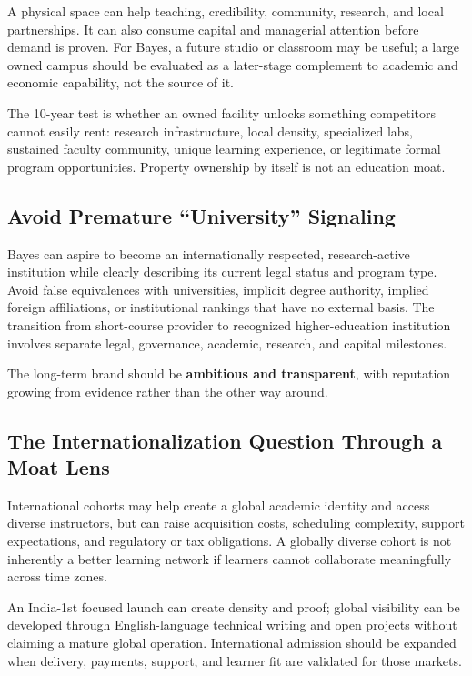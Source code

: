 A physical space can help teaching, credibility, community, research, and local partnerships. It can also consume capital and managerial attention before demand is proven. For Bayes, a future studio or classroom may be useful; a large owned campus should be evaluated as a later-stage complement to academic and economic capability, not the source of it.

The 10-year test is whether an owned facility unlocks something competitors cannot easily rent: research infrastructure, local density, specialized labs, sustained faculty community, unique learning experience, or legitimate formal program opportunities. Property ownership by itself is not an education moat.

\subsection{Avoid Premature ``University'' Signaling}
\label{sec:avoid_premature_university_signaling}

Bayes can aspire to become an internationally respected, research-active institution while clearly describing its current legal status and program type. Avoid false equivalences with universities, implicit degree authority, implied foreign affiliations, or institutional rankings that have no external basis. The transition from short-course provider to recognized higher-education institution involves separate legal, governance, academic, research, and capital milestones.

The long-term brand should be \textbf{ambitious and transparent}, with reputation growing from evidence rather than the other way around.

\subsection{The Internationalization Question Through a Moat Lens}
\label{sec:internationalization_moat_lens}

International cohorts may help create a global academic identity and access diverse instructors, but can raise acquisition costs, scheduling complexity, support expectations, and regulatory or tax obligations. A globally diverse cohort is not inherently a better learning network if learners cannot collaborate meaningfully across time zones.

An India-1st focused launch can create density and proof; global visibility can be developed through English-language technical writing and open projects without claiming a mature global operation. International admission should be expanded when delivery, payments, support, and learner fit are validated for those markets.

